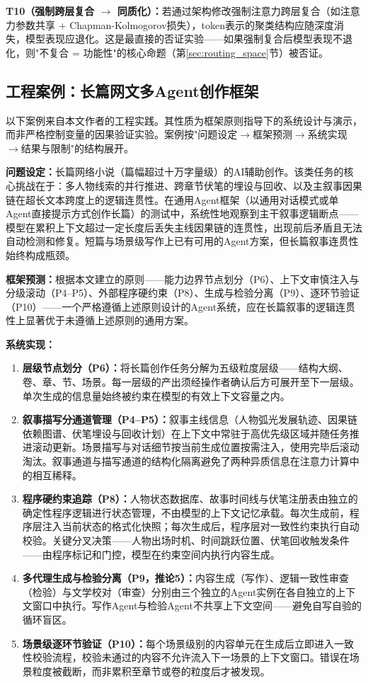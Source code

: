 \documentclass[11pt,a4paper]{article}
\theoremstyle{definition}
\begin{document}
\textbf{T10（强制跨层复合 $\to$ 同质化）：}若通过架构修改强制注意力跨层复合（如注意力参数共享 + Chapman-Kolmogorov损失），token表示的聚类结构应随深度消失，模型表现应退化。这是最直接的否证实验——如果强制复合后模型表现不退化，则"不复合 = 功能性"的核心命题（第\ref{sec:routing_space}节）被否证。

\subsection{工程案例：长篇网文多Agent创作框架}
\label{sec:case}

以下案例来自本文作者的工程实践。其性质为框架原则指导下的系统设计与演示，而非严格控制变量的因果验证实验。案例按"问题设定$\to$框架预测$\to$系统实现$\to$结果与限制"的结构展开。

\textbf{问题设定：}长篇网络小说（篇幅超过十万字量级）的AI辅助创作。该类任务的核心挑战在于：多人物线索的并行推进、跨章节伏笔的埋设与回收、以及主叙事因果链在超长文本跨度上的逻辑连贯性。在通用Agent框架（以通用对话模式或单Agent直接提示方式创作长篇）的测试中，系统性地观察到主干叙事逻辑断点——模型在累积上下文超过一定长度后丢失主线因果链的连贯性，出现前后矛盾且无法自动检测和修复。短篇与场景级写作上已有可用的Agent方案，但长篇叙事连贯性始终构成瓶颈。

\textbf{框架预测：}根据本文建立的原则——能力边界节点划分（P6）、上下文审慎注入与分级滚动（P4--P5）、外部程序硬约束（P8）、生成与检验分离（P9）、逐环节验证（P10）——一个严格遵循上述原则设计的Agent系统，应在长篇叙事的逻辑连贯性上显著优于未遵循上述原则的通用方案。

\textbf{系统实现：}
\begin{enumerate}[leftmargin=*,itemsep=0.3em]
    \item \textbf{层级节点划分（P6）：}将长篇创作任务分解为五级粒度层级——结构大纲、卷、章、节、场景。每一层级的产出须经操作者确认后方可展开至下一层级。单次生成的信息量始终被约束在模型的有效上下文容量之内。
    \item \textbf{叙事描写分通道管理（P4--P5）：}叙事主线信息（人物弧光发展轨迹、因果链依赖图谱、伏笔埋设与回收计划）在上下文中常驻于高优先级区域并随任务推进滚动更新。场景描写与对话细节按当前生成位置按需注入，使用完毕后滚动淘汰。叙事通道与描写通道的结构化隔离避免了两种异质信息在注意力计算中的相互稀释。
    \item \textbf{程序硬约束追踪（P8）：}人物状态数据库、故事时间线与伏笔注册表由独立的确定性程序逻辑进行状态管理，不由模型的上下文记忆承载。每次生成前，程序层注入当前状态的格式化快照；每次生成后，程序层对一致性约束执行自动校验。关键分叉决策——人物出场时机、时间跳跃位置、伏笔回收触发条件——由程序标记和门控，模型在约束空间内执行内容生成。
    \item \textbf{多代理生成与检验分离（P9，推论5）：}内容生成（写作）、逻辑一致性审查（检验）与文学校对（审查）分别由三个独立的Agent实例在各自独立的上下文窗口中执行。写作Agent与检验Agent不共享上下文空间——避免自写自验的循环盲区。
    \item \textbf{场景级逐环节验证（P10）：}每个场景级别的内容单元在生成后立即进入一致性校验流程，校验未通过的内容不允许流入下一场景的上下文窗口。错误在场景粒度被截断，而非累积至章节或卷的粒度后才被发现。
\end{enumerate}
\end{document}
